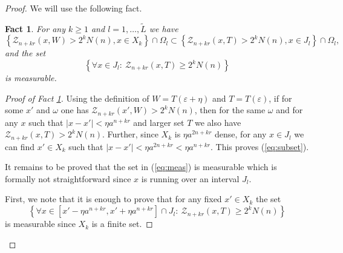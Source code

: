 \documentclass[amssymb,amsfonts,12pt,verbatim,righttag,oneside]{amsart}
\numberwithin{equation}{section} %
\theoremstyle{plain}
\newcommand*{\eps}{\ensuremath{\varepsilon }}
\newcommand*{\Z}{\ensuremath{\mathcal{Z}}}
\newcommand*{\HH}{\ensuremath{T}}
\theoremstyle{plain}
\newtheorem{fact}[theorem]{Fact}
\begin{document}
\begin{proof}
We will use the following fact.
\begin{fact}\label{fact:meas}
For any $k\geq 1$ and $l=1,\dots,\widetilde{L}$ we have
\begin{equation}\label{eq:subset}
\left\{\Z_{n+kr}(x,W)> 2^k N(n),x\in X_k \right\} \cap \Omega_l\subset \left\{\Z_{n+kr}(x,\HH)> 2^k N(n),x\in J_l \right\} \cap \Omega_l,
\end{equation}
and the set
\begin{equation}\label{eq:meas}
\left\{\forall x\in J_l:\ \Z_{n+kr}(x,\HH)\geq 2^kN(n) \right\}
\end{equation}
is measurable.
\end{fact}

\begin{proof}[Proof of Fact \ref{fact:meas}]
Using the definition of
$W=T(\eps+\eta)$ and $\HH=T(\eps)$, if for some $x'$ and $\omega$ one has
$\Z_{n+kr}(x',W)> 2^k N(n)$, then for the same $\omega$ and for any $x$ such that
$|x-x'|<\eta a^{n+kr}$ and larger set $\HH$ we also have $\Z_{n+kr}(x,\HH)> 2^k N(n)$.
Further, since $X_k$ is $\eta a^{2n+kr}$ dense, for any $x\in J_l$ we can find $x'\in X_k$ such that
$|x-x'|<\eta a^{2n+kr}<\eta a^{n+kr}$. This proves (\ref{eq:subset}).

It  remains to be proved that the set in (\ref{eq:meas}) is measurable which is formally not straightforward since $x$ is running over an interval $J_l$.

First, we note that it is enough to prove that for any fixed $x'\in X_k$ the set
\begin{equation*}
 \left\{\forall x\in \left[x'- \eta a^{n+kr},x'+ \eta a^{n+kr}\right]\cap J_l:\  \Z_{n+kr}(x,\HH)\geq 2^kN(n) \right\}
\end{equation*}
is measurable since $X_k$ is a finite set.


\end{proof}
\end{proof}
\end{document}
